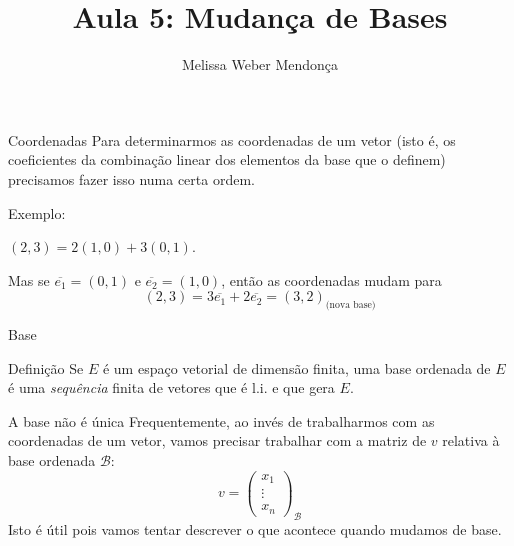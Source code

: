 \documentclass{beamer}
\title{Aula 5: Mudança de Bases}
\author{Melissa Weber Mendonça}
\begin{document}
\frame{\maketitle}

\begin{darkframes}

\begin{frame}{Coordenadas}
  Para determinarmos as coordenadas de um vetor (isto é, os coeficientes da combinação linear dos elementos da base que o definem) precisamos fazer isso numa certa ordem.

  \alert{Exemplo:}
  
  $(2,3) = 2(1,0)+3(0,1)$.

  Mas se $\overline{e_1} = (0,1)$ e $\overline{e_2} = (1,0)$, então as coordenadas mudam para 
  \begin{equation*}
     (2,3) = 3\overline{e_1}+2\overline{e_2} = (3,2)_{\text{(nova base)}}
  \end{equation*}
\end{frame}

\begin{frame}{Base}
  \begin{block}{Definição}
    Se $E$ é um espaço vetorial de dimensão finita, uma base ordenada de $E$ é uma \emph{sequência} finita de vetores que é l.i. e que gera $E$.
  \end{block}
  \vfill
\end{frame}

\begin{frame}{A base não é única}
  Frequentemente, ao invés de trabalharmos com as coordenadas de um vetor, vamos precisar trabalhar com a matriz de $v$ relativa à base ordenada ${\mathcal{B}}$:
  \begin{equation*}
    v =
    \begin{pmatrix}
      x_1\\\vdots\\ x_n
    \end{pmatrix}_{\mathcal{B}}
  \end{equation*}
  Isto é útil pois vamos tentar descrever o que acontece quando mudamos de base.
\end{frame}


\end{darkframes}
\end{document}
